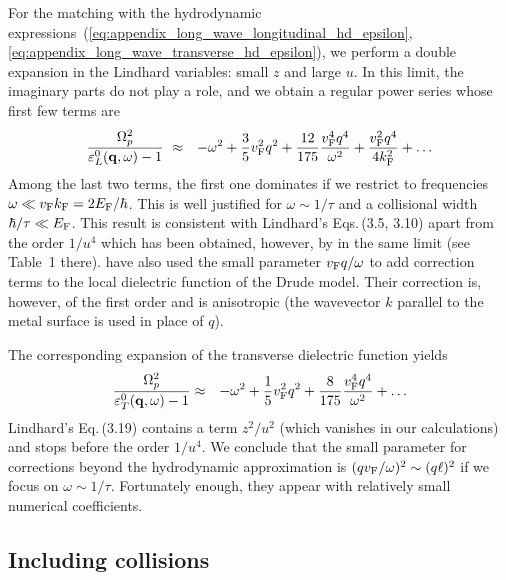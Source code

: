\documentclass[11pt, oneside]{article}   	%
\def\OmegaP{\Omega_{p}}
\begin{document}
For the matching with the hydrodynamic expressions~(\ref{eq:appendix_long_wave_longitudinal_hd_epsilon},
\ref{eq:appendix_long_wave_transverse_hd_epsilon}), we perform a double expansion
in the Lindhard variables: small $z$ and large $u$. In this limit, the imaginary parts
do not play a role, and we obtain a regular power series whose first few terms are
\begin{eqnarray}
\frac{ \OmegaP^2 }{ \varepsilon^0_{L}( {\bf q}, \omega ) - 1} & \approx &
- \omega^2
+ \frac{3}{5} v_{\rm F}^2 q^2 
+ \frac{12}{175} \frac{ v_{\rm F}^4 q^4 }{\omega ^2}
+ \frac{ v_{\rm F}^2 q^4 }{ 4 k_{\rm F}^2 }
+ \ldots
\label{eq:appendix_longitudinal_Lindhard_epsilon_expansion_omega_tilde}
\end{eqnarray}
Among the last two terms, the first one dominates if we restrict to frequencies
$\omega \ll v_{\rm F} k_{\rm F} = 2 E_{\rm F}/\hbar$. This is well justified for
$\omega \sim 1/\tau$ and a collisional width $\hbar/\tau \ll E_{\rm F}$.
This result is consistent with Lindhard's Eqs.\,(3.5, 3.10) 
apart from the order $1/u^4$ which has been obtained, however, by 
\citet{Arista_1984}
in the same limit (see Table~1 there). 
\citet{Klimchitskaya_2020b} have also used the small parameter $v_{\rm F} q / \omega$
to add correction terms to the local dielectric function of the Drude model. 
Their correction is, however, of the first order and is anisotropic (the wavevector
$k$ parallel to the metal surface is used in place of $q$).

The corresponding expansion of the transverse dielectric function yields
\begin{eqnarray}
\frac{ \OmegaP^2 }{ \varepsilon^0_{T}( {\bf q}, \omega ) - 1} & \approx &
-\omega ^2 + \frac{1}{5} v_{\rm F}^2 q^2 + \frac{ 8 }{ 175} \frac{ v_{\rm F}^4 q^4}{\omega^2}
+ \ldots
\label{eq:appendix_transverse_Lindhard_epsilon_expansion_omega_tilde}
\end{eqnarray}
Lindhard's Eq.\,(3.19) contains a term $z^2/u^2$ (which vanishes in 
our calculations) and stops before the order $1/u^4$.
We conclude that the small parameter for corrections beyond the hydrodynamic approximation
is $(q v_{\rm F} / \omega)^2 \sim (q \ell)^2$ if we focus on $\omega \sim 1/\tau$. Fortunately
enough, they appear with relatively small numerical coefficients.


\subsection{Including collisions}
\label{sec:appendix_expansion_Mermin_function}
\end{document}
